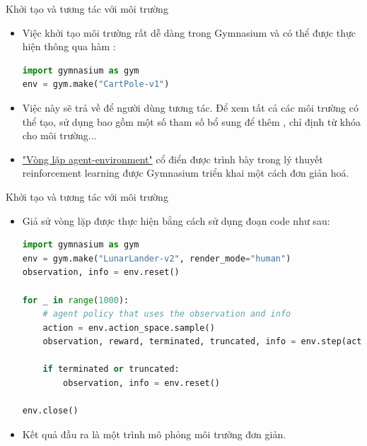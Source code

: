 \documentclass[10pt,aspectratio=169]{beamer}
\begin{document}
\begin{frame}[fragile]{Khởi tạo và tương tác với môi trường}{\subsecname}
\begin{itemize}
\setlength\itemsep{8pt}
\item Việc khởi tạo môi trường rất dễ dàng trong Gymnasium và có thể được thực hiện thông qua hàm :\\
\scriptsize
\begin{lstlisting}[language=Python]
import gymnasium as gym
env = gym.make("CartPole-v1")
\end{lstlisting}
\normalsize
\item Việc này sẽ trả về  để người dùng tương tác. Để xem tất cả các môi trường có thể tạo, sử dụng  bao gồm một số tham số bổ sung để thêm , chỉ định từ khóa cho môi trường...
\item \hyperlink{loop}{"Vòng lặp agent-environment"} cổ điển được trình bày trong lý thuyết reinforcement learning được Gymnasium triển khai một cách đơn giản hoá.
\end{itemize}
\end{frame}

\begin{frame}[fragile]{Khởi tạo và tương tác với môi trường}{\subsecname}
\begin{itemize}
\setlength\itemsep{8pt}
\item Giả sử vòng lặp được thực hiện bằng cách sử dụng đoạn code như sau:\\
\scriptsize
\begin{lstlisting}[language=Python]
import gymnasium as gym
env = gym.make("LunarLander-v2", render_mode="human")
observation, info = env.reset()

for _ in range(1000):
    # agent policy that uses the observation and info
    action = env.action_space.sample()
    observation, reward, terminated, truncated, info = env.step(action)

    if terminated or truncated:
        observation, info = env.reset()

env.close()
\end{lstlisting}
\normalsize
\item Kết quả đầu ra là một trình mô phỏng môi trường đơn giản.
\end{itemize}
\end{frame}
\end{document}
